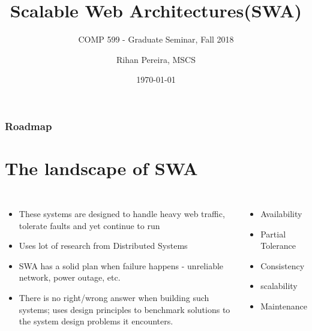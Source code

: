 \documentclass[9pt]{beamer}
\title{Scalable Web Architectures(SWA)}
\subtitle{COMP 599 - Graduate Seminar, Fall 2018}
\author{Rihan Pereira, MSCS}
\institute[California State University, Channel Islands]
{
  Department of Computer Science\\
  California State University, Channel Islands
}
\date{\today}
\begin{document}
\begin{frame}[plain]
  \frametitle{}
  \titlepage
\end{frame}

\begin{frame}[plain]
  \frametitle{Roadmap}
  \tableofcontents
\end{frame}


\section{The landscape of SWA}
\begin{frame}{}
  \begin{columns}
    \begin{itemize}
    \item These systems are designed to handle heavy web traffic, tolerate faults and yet continue to run
      \pause
    \item Uses lot of research from Distributed Systems
      \pause
    \item SWA has a solid plan when failure happens - unreliable network, power outage, etc.
      \pause
    \item There is no right/wrong answer when building such systems; uses design principles to benchmark
      solutions to the system design problems it encounters.
      \pause
    \end{itemize}

    \begin{itemize}
    \item Availability
    \item Partial Tolerance
    \item Consistency
    \item scalability
    \item Maintenance
    \end{itemize}
  \end{columns}
\end{frame}

\end{document}
